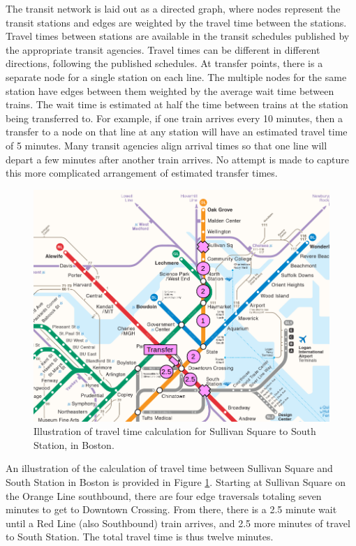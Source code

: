 \documentclass[11pt]{article}
\begin{document}
The transit network is laid out as a directed graph, where nodes represent the transit stations and edges are weighted by the travel time between the stations. Travel times between stations are available in the transit schedules published by the appropriate transit agencies. Travel times can be different in different directions, following the published schedules. At transfer points, there is a separate node for a single station on each line. The multiple nodes for the same station have edges between them weighted by the average wait time between trains. The wait time is estimated at half the time between trains at the station being transferred to. For example, if one train arrives every 10 minutes, then a transfer to a node on that line at any station will have an estimated travel time of 5 minutes. Many transit agencies align arrival times so that one line will depart a few minutes after another train arrives. No attempt is made to capture this more complicated arrangement of estimated transfer times. 

\begin{figure}
\begin{center}\includegraphics[scale=0.7]{transfer_demonstration}\end{center}\caption{Illustration of travel time calculation for Sullivan Square to South Station, in Boston.}\label{fig:f2}
\end{figure}

An illustration of the calculation of travel time between Sullivan Square and South Station in Boston is provided in Figure \ref{fig:f2}. Starting at Sullivan Square on the Orange Line southbound, there are four edge traversals totaling seven minutes to get to Downtown Crossing. From there, there is a 2.5 minute wait until a Red Line (also Southbound) train arrives, and 2.5 more minutes of travel to South Station. The total travel time is thus twelve minutes. 
\end{document}
